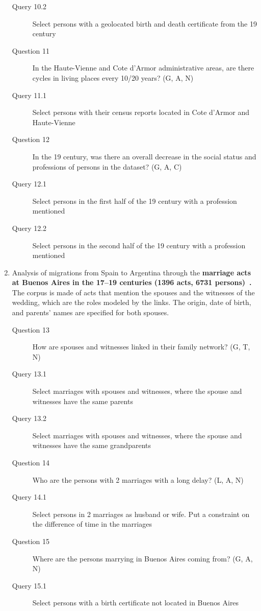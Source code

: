 \begin{enumerate}
\begin{footnotesize}
\begin{description}
    \item[\myindent Query 10.2] Select persons with a geolocated birth and death certificate from the 19 century
    \item[Question 11] In the Haute-Vienne and Cote d'Armor administrative areas, are there cycles in living places every 10/20 years? (G, A, N)
    \item[\myindent Query 11.1] Select persons with their census reports located in Cote d’Armor and Haute-Vienne
    \item[Question 12] In the 19 century, was there an overall decrease in the social status and professions of persons in the dataset? (G, A, C)
    \item[\myindent Query 12.1] Select persons in the first half of the 19 century with a profession mentioned
    \item[\myindent Query 12.2] Select persons in the second half of the 19 century with a profession mentioned
    \end{description}
    \end{footnotesize}

    \item Analysis of migrations from Spain to Argentina through the \textbf{marriage acts at Buenos Aires in the 17--19 centuries (1396 acts, 6731 persons)~\cite{moutoukiasBuenosAiresPort2016}.}
    The corpus is made of acts that mention the spouses and the witnesses of the wedding, which are the roles modeled by the links. The origin, date of birth, and parents' names are specified for both spouses.
    \begin{footnotesize}
    \begin{description}
    \item[Question 13] How are spouses and witnesses linked in their family network? (G, T, N)
    \item[\myindent Query 13.1] Select marriages with spouses and witnesses, where the spouse and witnesses have the same parents
    \item[\myindent Query 13.2] Select marriages with spouses and witnesses, where the spouse and witnesses have the same grandparents
    \item[Question 14] Who are the persons with 2 marriages with a long delay? (L, A, N)
    \item[\myindent Query 14.1] Select persons in 2 marriages as husband or wife. Put a constraint on the difference of time in the marriages
    \item[Question 15] Where are the persons marrying in Buenos Aires coming from? (G, A, N)
    \item[\myindent Query 15.1] Select persons with a birth certificate not located in Buenos Aires
    \end{description}
    \end{footnotesize}


\end{enumerate}
